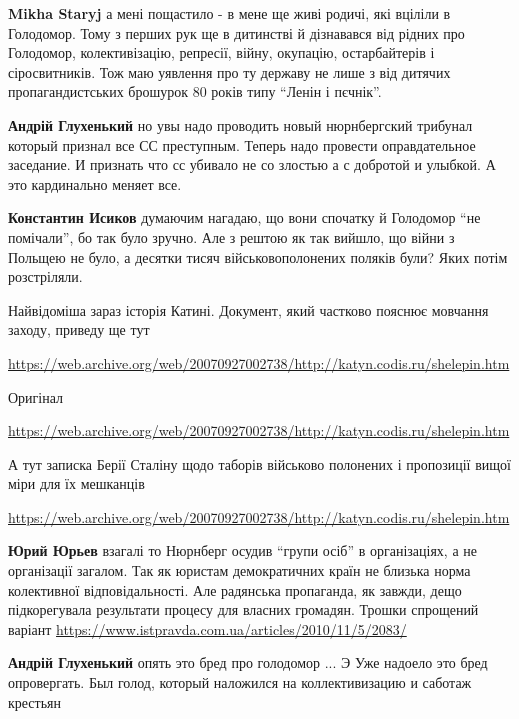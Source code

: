 \begin{itemize}
\begin{itemize}
\textbf{Mikha Staryj} а мені пощастило - в мене ще живі родичі, які вціліли в
Голодомор. Тому з перших рук ще в дитинстві й дізнавався від рідних про
Голодомор, колективізацію, репресії, війну, окупацію, остарбайтерів і
сіросвитників. Тож маю уявлення про ту державу не лише з від дитячих
пропагандистських брошурок 80 років типу \enquote{Ленін і пєчнік}.


\textbf{Андрій Глухенький} но увы надо проводить новый нюрнбергский трибунал
который признал все СС преступным. Теперь надо провести оправдательное
заседание. И признать что сс убивало не со злостью а с добротой и улыбкой. А
это кардинально меняет все.


\textbf{Константин Исиков} думаючим нагадаю, що вони спочатку й Голодомор
\enquote{не помічали}, бо так було зручно. Але з рештою як так вийшло, що війни
з Польщею не було, а десятки тисяч військовополонених поляків були? Яких потім
розстріляли. 

Найвідоміша зараз історія Катині. Документ, який частково пояснює
мовчання заходу, приведу ще тут

\url{https://web.archive.org/web/20070927002738/http://katyn.codis.ru/shelepin.htm}

Оригінал

\url{https://web.archive.org/web/20070927002738/http://katyn.codis.ru/shelepin.htm}

А тут записка Берії
Сталіну щодо таборів військово полонених і пропозиції вищої міри для їх
мешканців 

\url{https://web.archive.org/web/20070927002738/http://katyn.codis.ru/shelepin.htm}


\textbf{Юрий Юрьев} взагалі то Нюрнберг осудив \enquote{групи осіб} в організаціях, а не
організації загалом. Так як юристам демократичних країн не близька норма
колективної відповідальності. Але радянська пропаганда, як завжди, дещо
підкорегувала результати процесу для власних громадян. Трошки спрощений варіант
\url{https://www.istpravda.com.ua/articles/2010/11/5/2083/}

\textbf{Андрій Глухенький} опять это бред про голодомор ... Э Уже надоело это
бред опровергать.  Был голод, который наложился на коллективизацию и саботаж
крестьян



\end{itemize}
\end{itemize}
